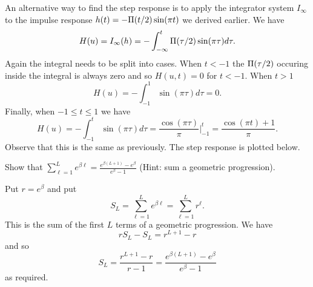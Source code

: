 \begin{excersizelist}
\begin{solution}
An alternative way to find the step response is to apply the integrator system $I_\infty$ to the impulse response $h(t) = -\Pi(t/2) \sin(\pi t)$ we derived earlier.  We have
\[
H(u) = I_\infty(h) = -\int_{-\infty}^t \Pi(\tau/2) \sin(\pi \tau) d\tau.
\]
Again the integral needs to be split into cases.  When $t < -1$ the $\Pi(\tau/2)$ occuring inside the integral is always zero and so $H(u,t) = 0$ for $t < -1$.  When $t > 1$ 
\[
H(u) = -\int_{-1}^1 \sin(\pi \tau) d\tau = 0.
\]
Finally, when $-1 \leq t \leq 1$ we have
\[
H(u) = -\int_{-1}^t \sin(\pi \tau) d\tau  = \frac{\cos(\pi \tau)}{\pi} \big\vert_{-1}^t = \frac{\cos(\pi t) + 1}{\pi}.
\]
Observe that this is the same as previously.  The step response is plotted below.

\begin{center}
\end{center}


\end{solution}

\item \label{excer:sumgeomeebeta} Show that $\sum_{\ell = 1}^L e^{\beta \ell} = \frac{e^{\beta (L+1)} - e^\beta}{e^\beta - 1}$  (Hint: sum a geometric progression).
\begin{solution}
Put $r = e^\beta$ and put
\[
S_L = \sum_{\ell = 1}^L e^{\beta \ell} = \sum_{\ell = 1}^L r^\ell.
\]
This is the sum of the first $L$ terms of a geometric progression.  We have
\[
r S_L - S_L = r^{L+1} - r
\]
and so
\[
S_L = \frac{r^{L+1} - r}{r - 1} =  \frac{e^{\beta (L+1)} - e^\beta}{e^\beta - 1}
\]
as required.
\end{solution}



\end{excersizelist}
